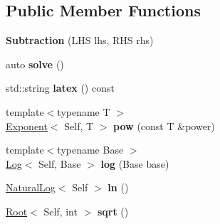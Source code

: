 \subsection*{\-Public \-Member \-Functions}
\begin{DoxyCompactItemize}
\item 
\hypertarget{classlatex_1_1math_1_1Subtraction_a26f15fee14c611cbc0fff0fb95c859b6}{{\bfseries \-Subtraction} (\-L\-H\-S lhs, \-R\-H\-S rhs)}\label{classlatex_1_1math_1_1Subtraction_a26f15fee14c611cbc0fff0fb95c859b6}

\item 
\hypertarget{classlatex_1_1math_1_1Subtraction_a36b9f0987e23d1b8ed9f624c7e7ca48f}{auto {\bfseries solve} ()}\label{classlatex_1_1math_1_1Subtraction_a36b9f0987e23d1b8ed9f624c7e7ca48f}

\item 
\hypertarget{classlatex_1_1math_1_1Subtraction_aa4ab82319d568a41353492cb84ab6296}{std\-::string {\bfseries latex} () const }\label{classlatex_1_1math_1_1Subtraction_aa4ab82319d568a41353492cb84ab6296}

\item 
\hypertarget{classlatex_1_1math_1_1Subtraction_ac7814b9c8feddad2aa3254ac7bee6088}{{\footnotesize template$<$typename T $>$ }\\\hyperlink{classlatex_1_1math_1_1Exponent}{\-Exponent}$<$ \-Self, \-T $>$ {\bfseries pow} (const \-T \&power)}\label{classlatex_1_1math_1_1Subtraction_ac7814b9c8feddad2aa3254ac7bee6088}

\item 
\hypertarget{classlatex_1_1math_1_1Subtraction_a5929a366cb0133508d844d46bd4d947c}{{\footnotesize template$<$typename Base $>$ }\\\hyperlink{classlatex_1_1math_1_1Log}{\-Log}$<$ \-Self, \-Base $>$ {\bfseries log} (\-Base base)}\label{classlatex_1_1math_1_1Subtraction_a5929a366cb0133508d844d46bd4d947c}

\item 
\hypertarget{classlatex_1_1math_1_1Subtraction_a10ffdc2e6c00dd8dabd03ac85f5ffce2}{\hyperlink{classlatex_1_1math_1_1NaturalLog}{\-Natural\-Log}$<$ \-Self $>$ {\bfseries ln} ()}\label{classlatex_1_1math_1_1Subtraction_a10ffdc2e6c00dd8dabd03ac85f5ffce2}

\item 
\hypertarget{classlatex_1_1math_1_1Subtraction_a87372721888d73e25d80db1bc09a42ea}{\hyperlink{classlatex_1_1math_1_1Root}{\-Root}$<$ \-Self, int $>$ {\bfseries sqrt} ()}\label{classlatex_1_1math_1_1Subtraction_a87372721888d73e25d80db1bc09a42ea}

\end{DoxyCompactItemize}
